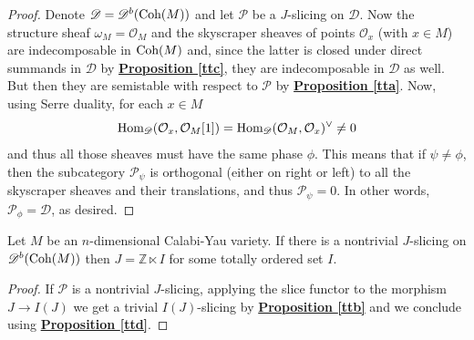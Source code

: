 \begin{proof}
Denote $\mathscr{D}=\mathscr{D}^b(\textnormal{Coh}(M))$ and let $\mathscr{P}$ be a $J$-slicing on $\mathscr{D}$. Now the structure sheaf $\omega_M=\mathcal{O}_M$ and the skyscraper sheaves of points $\mathcal{O}_x$ (with $x \in M$) are indecomposable in $\textnormal{Coh}(M)$ and, since the latter is closed under direct summands in $\mathscr{D}$ by \hyperref[ttc]{\textbf{Proposition \ref*{ttc}}}, they are indecomposable in $\mathscr{D}$ as well. But then they are semistable with respect to $\mathscr{P}$ by \hyperref[tta]{\textbf{Proposition \ref*{tta}}}. Now, using Serre duality, for each $x \in M$ $$\textnormal{Hom}_{\mathscr{D}}(\mathcal{O}_x,\mathcal{O}_M[1])=\textnormal{Hom}_{\mathscr{D}}(\mathcal{O}_M,\mathcal{O}_x)^{\vee} \not = 0 $$
and thus all those sheaves must have the same phase $\phi$. This means that if $\psi \not = \phi$, then the subcategory $\mathscr{P}_{\psi}$ is orthogonal (either on right or left) to all the skyscraper sheaves and their translations, and thus $\mathscr{P}_{\psi}=0$. In other words, $\mathscr{P}_{\phi}=\mathscr{D}$, as desired.  
\end{proof}

\begin{prop}\label{tte}
Let $M$ be an $n$-dimensional Calabi-Yau variety. If there is a nontrivial $J$-slicing on $\mathscr{D}^b(\textnormal{Coh}(M))$ then $J=\mathbb{Z} \ltimes I$ for some totally ordered set $I$.
\end{prop}

\begin{proof}
If $\mathscr{P}$ is a nontrivial $J$-slicing, applying the slice functor to the morphism $J \longrightarrow I(J)$ we get a trivial $I(J)$-slicing by \hyperref[ttb]{\textbf{Proposition \ref*{ttb}}} and we conclude using \hyperref[ttd]{\textbf{Proposition \ref*{ttd}}}.
\end{proof}


